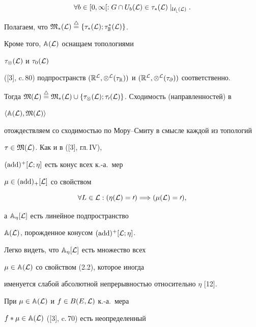 $$


\forall b\in[0,\infty[:G\cap U_b(\cal L)\in


\tau_*(\cal L)\mid_{U_b(\cal L)}.


$$


Полагаем, что $\frak M_*(\cal L)\overset{\triangle}{=}


\{\tau_*(\cal L);\tau^*_{\Bbb B}(\cal L)\}$.


Кроме того, $\Bbb A(\cal L)$ оснащаем топологиями


$\tau_\otimes(\cal L)$ и $\tau_0(\cal L)$


([3], c.\,80) подпространств $(\Bbb R^{\cal L},


\otimes^{\cal L}(\tau_{\Bbb R}))$ и $(\Bbb R^{\cal L},


\otimes^{\cal L}(\tau_\partial))$ соответственно.


Тогда $\frak M(\cal L)\overset{\triangle}{=}


\frak M_*(\cal L)\cup\{\tau_\otimes(\cal L);


\tau_0(\cal L)\}$. Сходимость (направленностей) в


$\langle\Bbb A(\cal L),\frak M(\cal L)\rangle$


отождествляем со сходимостью по Мору--Смиту в смысле каждой из топологий


$\tau\in\frak M(\cal L)$. Как и в ([3], гл.\,IV),


$(\operatorname{add})^+[\cal L;\eta]$ есть конус всех к.-а.~мер


$\mu\in(\operatorname{add})_+[\cal L]$ со свойством


\begin{equation}


\forall L\in\cal L:(\eta(L)=0)\Longrightarrow(\mu(L)=0),


\end{equation}


а $\Bbb A_\eta[\cal L]$ есть линейное подпространство


$\Bbb A(\cal L)$, порожденное конусом $(\operatorname{add})^+[\cal L;\eta]$.


Легко видеть, что $\Bbb A_\eta[\cal L]$ есть множество всех


$\mu\in\Bbb A(\cal L)$ со свойством (2.2), которое иногда


именуется слабой абсолютной непрерывностью относительно $\eta$ [12].


При $\mu\in\Bbb A(\cal L)$ и $f\in B(E,\cal L)$ к.-а.~мера\linebreak


$f*\mu\in\Bbb A(\cal L)$ ([3], c.\,70) есть неопределенный


